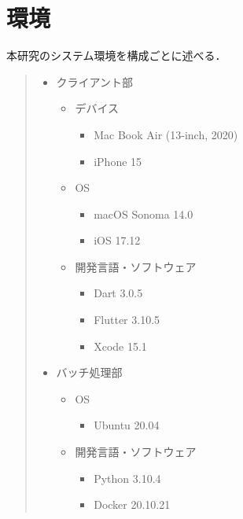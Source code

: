\section{環境}

本研究のシステム環境を構成ごとに述べる．

\begin{quote}
  \begin{itemize}
    \item クライアント部
    \begin{itemize}
      \item デバイス
      \begin{itemize}
        \item Mac Book Air (13-inch, 2020)
        \item iPhone 15
      \end{itemize}
      \item OS
      \begin{itemize}
        \item macOS Sonoma 14.0
        \item iOS 17.12
      \end{itemize}
      \item 開発言語・ソフトウェア
      \begin{itemize}
        \item Dart 3.0.5
        \item Flutter 3.10.5
        \item Xcode 15.1
      \end{itemize}
    \end{itemize}
    \item バッチ処理部
    \begin{itemize}
      \item OS
      \begin{itemize}
        \item Ubuntu 20.04
      \end{itemize}
      \item 開発言語・ソフトウェア
      \begin{itemize}
        \item Python 3.10.4
        \item Docker 20.10.21
      \end{itemize}
    \end{itemize}
  \end{itemize}
\end{quote}

